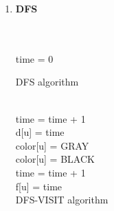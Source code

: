 \documentclass[11pt]{article}
\begin{document}
\begin{enumerate}
    \item \textbf{DFS} \\\\
    \begin{algorithm}[H]
    \Indm{}\\
    \Indp
        time = 0 \\
    \caption{DFS algorithm}
    \end{algorithm}
    \begin{algorithm}[H]
    \Indm{}\\
    \Indp
        time = time + 1 \\
        d[u] = time \\
        color[u] = GRAY \\
        color[u] = BLACK \\
        time = time + 1 \\
        f[u] = time \\
        \caption{DFS-VISIT algorithm}
    \end{algorithm}
    

\end{enumerate}
\end{document}
